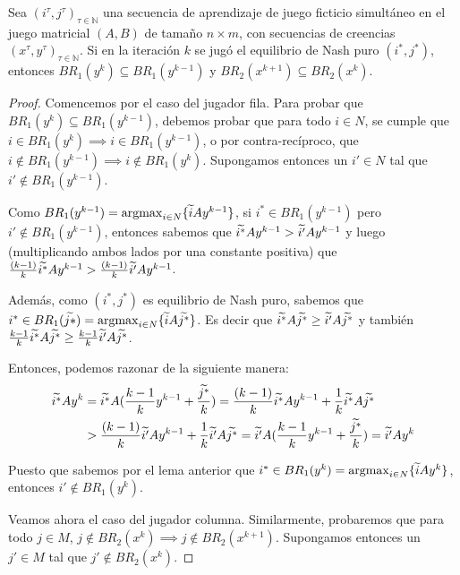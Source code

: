\begin{lemma}
    Sea $(i^\tau, j^\tau)_{\tau \in \mathbb{N}}$ una secuencia de aprendizaje de juego ficticio simultáneo en el juego matricial $(A, B)$ de tamaño $n \times m$, con secuencias de creencias $(x^\tau, y^\tau)_{\tau \in \mathbb{N}}$. Si en la iteración $k$ se jugó el equilibrio de Nash puro $(i^*, j^*)$, entonces $BR_1(y^{k}) \subseteq BR_1(y^{k-1})$ y $BR_2(x^{k+1}) \subseteq BR_2(x^{k})$.
\end{lemma}
\begin{proof}
    Comencemos por el caso del jugador fila. Para probar que $BR_1(y^{k}) \subseteq BR_1(y^{k-1})$, debemos probar que para todo $i \in N$, se cumple que $i \in BR_1(y^{k}) \implies i \in BR_1(y^{k-1})$, o por contra-recíproco, que $i \notin BR_1(y^{k-1}) \implies i \notin BR_1(y^{k})$. Supongamos entonces un $i' \in N$ tal que $i' \notin BR_1(y^{k-1})$.

    Como $BR_1(y^{k-1}) = \operatorname*{argmax}_{i \in N} \{\widetilde{i}Ay^{k-1}\}$, si $i^* \in BR_1(y^{k-1})$ pero $i' \notin BR_1(y^{k-1})$, entonces sabemos que $\widetilde{i^*}Ay^{k-1} > \widetilde{i'}Ay^{k-1}$ y luego (multiplicando ambos lados por una constante positiva) que $\frac{(k - 1)}{k} \widetilde{i^*}Ay^{k-1} > \frac{(k - 1)}{k} \widetilde{i'}Ay^{k-1}$.
    
    Además, como $(i^*, j^*)$ es equilibrio de Nash puro, sabemos que $i^* \in BR_1(\widetilde{j*}) = \operatorname*{argmax}_{i \in N} \{\widetilde{i}A\widetilde{j^*}\}$. Es decir que $\widetilde{i^*}A\widetilde{j^*} \ge \widetilde{i'}A\widetilde{j^*}$ y también $\frac{k - 1}{k} \widetilde{i^*}A\widetilde{j^*} \ge \frac{k - 1}{k} \widetilde{i'}A\widetilde{j^*}$.

    Entonces, podemos razonar de la siguiente manera:
    \begin{align*}
        \widetilde{i^*}Ay^k &= \widetilde{i^*}A(\frac{k - 1}{k} y^{k-1} + \frac{\widetilde{j^*}}{k}) = \frac{(k - 1)}{k} \widetilde{i^*}Ay^{k-1} + \frac{1}{k}\widetilde{i^*}A\widetilde{j^*}\\
        &> \frac{(k - 1)}{k} \widetilde{i'}Ay^{k-1} + \frac{1}{k}\widetilde{i'}A\widetilde{j^*} = \widetilde{i'}A(\frac{k - 1}{k} y^{k-1} + \frac{\widetilde{j^*}}{k}) = \widetilde{i'}Ay^k
    \end{align*}

    Puesto que sabemos por el lema anterior que $i^* \in BR_1(y^{k}) = \operatorname*{argmax}_{i \in N} \{\widetilde{i}Ay^{k}\}$, entonces $i' \notin BR_1(y^{k})$.
    
    Veamos ahora el caso del jugador columna. Similarmente, probaremos que para todo $j \in M$, $ j \notin BR_2(x^k) \implies j \notin BR_2(x^{k+1})$. Supongamos entonces un $j' \in M$ tal que $j' \notin BR_2(x^k)$.


\end{proof}
